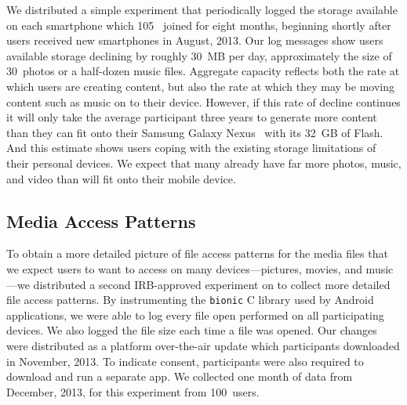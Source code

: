 We distributed a simple experiment that periodically logged the storage
available on each smartphone which 105~\PhoneLab{} joined for eight months,
beginning shortly after \PhoneLab{} users received new smartphones in August,
2013. Our log messages show users available storage declining by roughly
30~MB per day, approximately the size of 30~photos or a half-dozen music
files. Aggregate capacity reflects both the rate at which users are creating
content, but also the rate at which they may be moving content such as music
on to their device. However, if this rate of decline continues it will only
take the average \PhoneLab{} participant three years to generate more content
than they can fit onto their Samsung Galaxy Nexus~\cite{galaxynexus} with its
32~GB of Flash. And this estimate shows users coping with the existing
storage limitations of their personal devices. We expect that many already
have far more photos, music, and video than will fit onto their mobile
device.

\subsection{Media Access Patterns}

To obtain a more detailed picture of file access patterns for the media files
that we expect users to want to access on many devices---pictures, movies,
and music---we distributed a second IRB-approved experiment on \PhoneLab{} to
collect more detailed file access patterns. By instrumenting the
\texttt{bionic} C library used by Android applications, we were able to log
every file open performed on all participating devices. We also logged the
file size each time a file was opened. Our changes were distributed as a
platform over-the-air update which \PhoneLab{} participants downloaded in
November, 2013. To indicate consent, participants were also required to
download and run a separate app. We collected one month of data from
December, 2013, for this experiment from 100~users.


